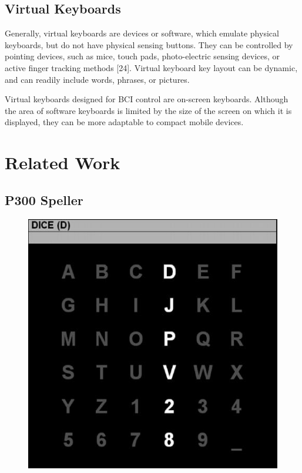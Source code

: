 \documentclass[12pt,titlepage]{article}
\begin{document}
\subsection{Virtual Keyboards} %

Generally, virtual keyboards are devices or software, which emulate physical keyboards, but do 
not have physical sensing buttons.  They can be controlled by pointing devices, such as mice, 
touch pads, photo-electric sensing devices, or active finger tracking methods [24].  Virtual 
keyboard key layout can be dynamic, and can readily include words, phrases, or pictures. 

Virtual keyboards designed for BCI control are on-screen keyboards.  Although the area of 
software keyboards is limited by the size of the screen on which it is displayed, they can be 
more adaptable to compact mobile devices.

\section{Related Work}

\subsection{P300 Speller}

\begin{figure}[t]
\begin{center}
	\includegraphics[scale=0.40]{Figure2.jpeg}
	\label{fig:P300}
\end{center}
\end{figure}
\end{document}
